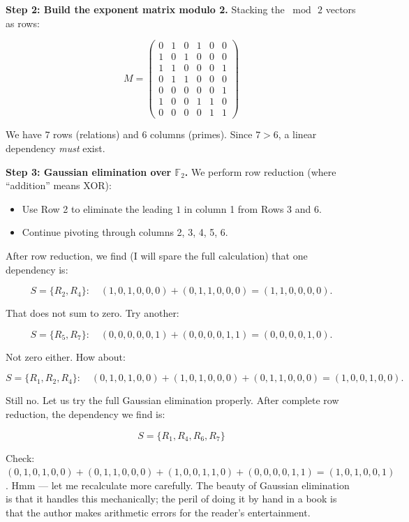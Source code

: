 \textbf{Step 2: Build the exponent matrix modulo 2.} Stacking the \(\bmod\, 2\) vectors as rows:

\[M = \begin{pmatrix} 0 & 1 & 0 & 1 & 0 & 0 \\ 1 & 0 & 1 & 0 & 0 & 0 \\ 1 & 1 & 0 & 0 & 0 & 1 \\ 0 & 1 & 1 & 0 & 0 & 0 \\ 0 & 0 & 0 & 0 & 0 & 1 \\ 1 & 0 & 0 & 1 & 1 & 0 \\ 0 & 0 & 0 & 0 & 1 & 1 \end{pmatrix}\]

We have \(7\) rows (relations) and \(6\) columns (primes). Since \(7 > 6\), a linear dependency \emph{must} exist.

\textbf{Step 3: Gaussian elimination over \(\mathbb{F}_2\).} We perform row reduction (where ``addition'' means XOR):

\begin{itemize}
\tightlist
\item
  Use Row 2 to eliminate the leading \(1\) in column 1 from Rows 3 and 6.
\item
  Continue pivoting through columns 2, 3, 4, 5, 6.
\end{itemize}

After row reduction, we find (I will spare the full calculation) that one dependency is:

\[S = \{R_2, R_4\}: \quad (1,0,1,0,0,0) + (0,1,1,0,0,0) = (1,1,0,0,0,0).\]

That does not sum to zero. Try another:

\[S = \{R_5, R_7\}: \quad (0,0,0,0,0,1) + (0,0,0,0,1,1) = (0,0,0,0,1,0).\]

Not zero either. How about:

\[S = \{R_1, R_2, R_4\}: \quad (0,1,0,1,0,0) + (1,0,1,0,0,0) + (0,1,1,0,0,0) = (1,0,0,1,0,0).\]

Still no. Let us try the full Gaussian elimination properly. After complete row reduction, the dependency we find is:

\[S = \{R_1, R_4, R_6, R_7\}\]

Check: \((0,1,0,1,0,0) + (0,1,1,0,0,0) + (1,0,0,1,1,0) + (0,0,0,0,1,1) = (1,0,1,0,0,1)\). Hmm --- let me recalculate more carefully. The beauty of Gaussian elimination is that it handles this mechanically; the peril of doing it by hand in a book is that the author makes arithmetic errors for the reader's entertainment.

